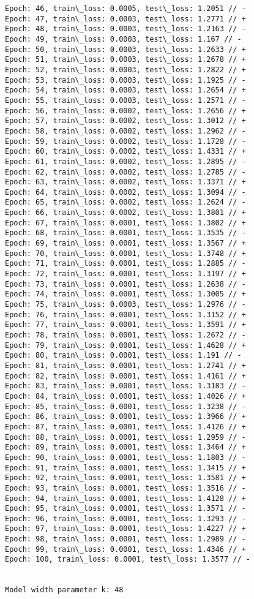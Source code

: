 \documentclass[11pt]{article}
\begin{document}
\begin{Verbatim}[commandchars=\\\{\}]
Epoch: 46, train\_loss: 0.0005, test\_loss: 1.2051 // -
Epoch: 47, train\_loss: 0.0003, test\_loss: 1.2771 // +
Epoch: 48, train\_loss: 0.0003, test\_loss: 1.2163 // -
Epoch: 49, train\_loss: 0.0003, test\_loss: 1.167 // -
Epoch: 50, train\_loss: 0.0003, test\_loss: 1.2633 // +
Epoch: 51, train\_loss: 0.0003, test\_loss: 1.2678 // +
Epoch: 52, train\_loss: 0.0003, test\_loss: 1.2822 // +
Epoch: 53, train\_loss: 0.0003, test\_loss: 1.1925 // -
Epoch: 54, train\_loss: 0.0003, test\_loss: 1.2654 // +
Epoch: 55, train\_loss: 0.0003, test\_loss: 1.2571 // -
Epoch: 56, train\_loss: 0.0002, test\_loss: 1.2656 // +
Epoch: 57, train\_loss: 0.0002, test\_loss: 1.3012 // +
Epoch: 58, train\_loss: 0.0002, test\_loss: 1.2962 // -
Epoch: 59, train\_loss: 0.0002, test\_loss: 1.1728 // -
Epoch: 60, train\_loss: 0.0002, test\_loss: 1.4331 // +
Epoch: 61, train\_loss: 0.0002, test\_loss: 1.2895 // -
Epoch: 62, train\_loss: 0.0002, test\_loss: 1.2785 // -
Epoch: 63, train\_loss: 0.0002, test\_loss: 1.3371 // +
Epoch: 64, train\_loss: 0.0002, test\_loss: 1.3094 // -
Epoch: 65, train\_loss: 0.0002, test\_loss: 1.2624 // -
Epoch: 66, train\_loss: 0.0002, test\_loss: 1.3801 // +
Epoch: 67, train\_loss: 0.0001, test\_loss: 1.3802 // +
Epoch: 68, train\_loss: 0.0001, test\_loss: 1.3535 // -
Epoch: 69, train\_loss: 0.0001, test\_loss: 1.3567 // +
Epoch: 70, train\_loss: 0.0001, test\_loss: 1.3748 // +
Epoch: 71, train\_loss: 0.0001, test\_loss: 1.2885 // -
Epoch: 72, train\_loss: 0.0001, test\_loss: 1.3197 // +
Epoch: 73, train\_loss: 0.0001, test\_loss: 1.2638 // -
Epoch: 74, train\_loss: 0.0001, test\_loss: 1.3005 // +
Epoch: 75, train\_loss: 0.0003, test\_loss: 1.2976 // -
Epoch: 76, train\_loss: 0.0001, test\_loss: 1.3152 // +
Epoch: 77, train\_loss: 0.0001, test\_loss: 1.3591 // +
Epoch: 78, train\_loss: 0.0001, test\_loss: 1.2672 // -
Epoch: 79, train\_loss: 0.0001, test\_loss: 1.4628 // +
Epoch: 80, train\_loss: 0.0001, test\_loss: 1.191 // -
Epoch: 81, train\_loss: 0.0001, test\_loss: 1.2741 // +
Epoch: 82, train\_loss: 0.0001, test\_loss: 1.4161 // +
Epoch: 83, train\_loss: 0.0001, test\_loss: 1.3183 // -
Epoch: 84, train\_loss: 0.0001, test\_loss: 1.4026 // +
Epoch: 85, train\_loss: 0.0001, test\_loss: 1.3238 // -
Epoch: 86, train\_loss: 0.0001, test\_loss: 1.3966 // +
Epoch: 87, train\_loss: 0.0001, test\_loss: 1.4126 // +
Epoch: 88, train\_loss: 0.0001, test\_loss: 1.2959 // -
Epoch: 89, train\_loss: 0.0001, test\_loss: 1.3464 // +
Epoch: 90, train\_loss: 0.0001, test\_loss: 1.1803 // -
Epoch: 91, train\_loss: 0.0001, test\_loss: 1.3415 // +
Epoch: 92, train\_loss: 0.0001, test\_loss: 1.3581 // +
Epoch: 93, train\_loss: 0.0001, test\_loss: 1.3516 // -
Epoch: 94, train\_loss: 0.0001, test\_loss: 1.4128 // +
Epoch: 95, train\_loss: 0.0001, test\_loss: 1.3571 // -
Epoch: 96, train\_loss: 0.0001, test\_loss: 1.3293 // -
Epoch: 97, train\_loss: 0.0001, test\_loss: 1.4227 // +
Epoch: 98, train\_loss: 0.0001, test\_loss: 1.2989 // -
Epoch: 99, train\_loss: 0.0001, test\_loss: 1.4346 // +
Epoch: 100, train\_loss: 0.0001, test\_loss: 1.3577 // -


Model width parameter k: 48
    \end{Verbatim}
\end{document}

